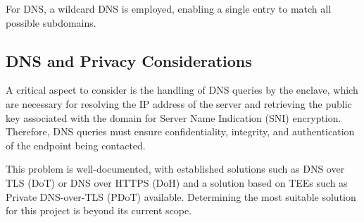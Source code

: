 For DNS, a wildcard DNS is employed, enabling a single entry to match all possible subdomains.

\subsection{DNS and Privacy Considerations}
A critical aspect to consider is the handling of DNS queries by the enclave, which are necessary for resolving the IP address of the server and retrieving the public key associated with the domain for Server Name Indication (SNI) encryption. Therefore, DNS queries must ensure confidentiality, integrity, and authentication of the endpoint being contacted.

This problem is well-documented, with established solutions such as DNS over TLS (DoT) \cite{rfc7858} or DNS over HTTPS (DoH) \cite{rfc8484} and a solution based on TEEs such as Private DNS-over-TLS (PDoT) \cite{Nakatsuka_2019} available. Determining the most suitable solution for this project is beyond its current scope.

